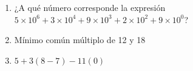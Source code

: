 \documentclass{article}
\begin{document}
\begin{enumerate}
    \item ¿A qué número corresponde la expresión \(5\times 10^6 + 3\times 10^4 + 9\times 10^3 + 2\times 10^2 + 9\times 10^0\)?
    \item Mínimo común múltiplo de 12 y 18
    \item \(5 + 3(8 - 7) - 11(0)\)
\end{enumerate}
\end{document}
